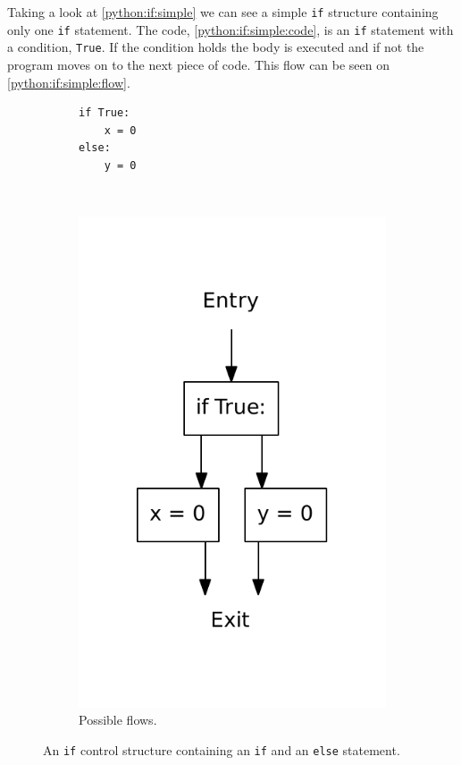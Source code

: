 Taking a look at \cref{python:if:simple} we can see a simple \texttt{if} structure containing only one \texttt{if} statement.
The code, \cref{python:if:simple:code}, is an \texttt{if} statement with a condition, \texttt{True}.
If the condition holds the body is executed and if not the program moves on to the next piece of code.
This flow can be seen on \cref{python:if:simple:flow}.


\begin{figure}
  \centering
  \begin{subfigure}[b]{0.4\textwidth}
    \begin{lstlisting}[style=python, caption={Code example.}, label={python:if:else:code}]
if True:
    x = 0
else:
    y = 0
    \end{lstlisting}
  \end{subfigure}
  ~ %
  \begin{subfigure}[b]{0.4\textwidth}
    \centering
    \includegraphics[scale=.5]{./figures/if_else.pdf}
    \caption{Possible flows.}
    \label{python:if:else:flow}
  \end{subfigure}
  \caption{An \texttt{if} control structure containing an \texttt{if} and an \texttt{else} statement.}
  \label{python:if:else}
\end{figure}

